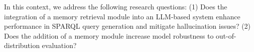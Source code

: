 

In this context, we address the following research questions: (1) Does the integration of a memory retrieval module into an LLM-based system enhance performance in SPARQL query generation and mitigate hallucination issues? (2) Does the addition of a memory module increase model robustness to out-of-distribution evaluation?


